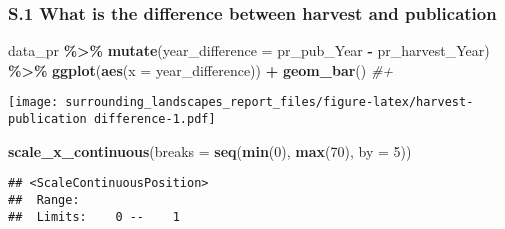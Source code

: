 \documentclass[
]{article}
\newenvironment{Shaded}{\begin{snugshade}}{\end{snugshade}}
\newcommand{\AttributeTok}[1]{\textcolor[rgb]{0.13,0.29,0.53}{#1}}
\newcommand{\CommentTok}[1]{\textcolor[rgb]{0.56,0.35,0.01}{\textit{#1}}}
\newcommand{\DecValTok}[1]{\textcolor[rgb]{0.00,0.00,0.81}{#1}}
\newcommand{\FunctionTok}[1]{\textcolor[rgb]{0.13,0.29,0.53}{\textbf{#1}}}
\newcommand{\NormalTok}[1]{#1}
\newcommand{\SpecialCharTok}[1]{\textcolor[rgb]{0.81,0.36,0.00}{\textbf{#1}}}
\begin{document}
\subsubsection{S.1 What is the difference between harvest and
publication}\label{s.1-what-is-the-difference-between-harvest-and-publication}

\begin{Shaded}
\begin{Highlighting}[]
\NormalTok{data\_pr }\SpecialCharTok{\%\textgreater{}\%} 
  \FunctionTok{mutate}\NormalTok{(}\AttributeTok{year\_difference =}\NormalTok{ pr\_pub\_Year }\SpecialCharTok{{-}}\NormalTok{ pr\_harvest\_Year) }\SpecialCharTok{\%\textgreater{}\%} 
  \FunctionTok{ggplot}\NormalTok{(}\FunctionTok{aes}\NormalTok{(}\AttributeTok{x =}\NormalTok{ year\_difference)) }\SpecialCharTok{+} 
  \FunctionTok{geom\_bar}\NormalTok{() }\CommentTok{\#+}
\end{Highlighting}
\end{Shaded}

\texttt{[image: surrounding\_landscapes\_report\_files/figure-latex/harvest-publication difference-1.pdf]}

\begin{Shaded}
\begin{Highlighting}[]
  \FunctionTok{scale\_x\_continuous}\NormalTok{(}\AttributeTok{breaks =} \FunctionTok{seq}\NormalTok{(}\FunctionTok{min}\NormalTok{(}\DecValTok{0}\NormalTok{), }
                                  \FunctionTok{max}\NormalTok{(}\DecValTok{70}\NormalTok{), }
                                  \AttributeTok{by =} \DecValTok{5}\NormalTok{))}
\end{Highlighting}
\end{Shaded}

\begin{verbatim}
## <ScaleContinuousPosition>
##  Range:  
##  Limits:    0 --    1
\end{verbatim}
\end{document}
